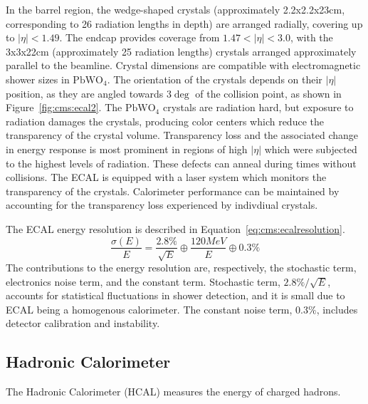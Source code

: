 

In the barrel region, the wedge-shaped crystals (approximately 2.2x2.2x23cm, corresponding to 26 radiation lengths in depth) are arranged radially, covering up to $|\eta|<1.49$. The endcap provides coverage from $1.47<|\eta|<3.0$, with the 3x3x22cm (approximately 25 radiation lengths)  crystals arranged approximately parallel to the beamline. Crystal dimensions are compatible with electromagnetic shower sizes in $\mathrm{PbWO_4}$. The orientation of the crystals depends on their $|\eta|$ position, as they are angled towards $3\deg$ of the collision point, as shown in Figure~\ref{fig:cms:ecal2}.
 The $\mathrm{PbWO_4}$ crystals are radiation hard, but exposure to radiation damages the crystals, producing color centers which reduce the transparency of the crystal volume. Transparency loss and the associated change in energy response is most prominent in regions of high $|\eta|$ which were subjected to the highest levels of radiation\cite{Cipriani:2018ule}. These defects can anneal during times without collisions. The ECAL is equipped with a laser system which monitors the transparency of the crystals. Calorimeter performance can be maintained by accounting for the transparency loss experienced by indivdiual crystals\cite{CERN-LHCC-97-033}.   

The ECAL energy resolution is described in Equation~\ref{eq:cms:ecalresolution}. 
\begin{equation}
\frac{\sigma(E)}{E}=\frac{2.8\%}{\sqrt{E}} \oplus \frac{120 MeV}{E} \oplus 0.3\%
\label{eq:cms:ecalresolution}
\end{equation}
The contributions to the energy resolution are, respectively, the stochastic term, electronics noise term, and the constant term. Stochastic term, $2.8\%/\sqrt{E}$, accounts for statistical fluctuations in shower detection, and it is small due to ECAL being a homogenous calorimeter. The constant noise term, $0.3\%$, includes detector calibration and instability\cite{Adzic:2007mi}.
\subsection{Hadronic Calorimeter}\label{ch:cms:hcal}
The Hadronic Calorimeter (HCAL) measures the energy of charged hadrons. 

